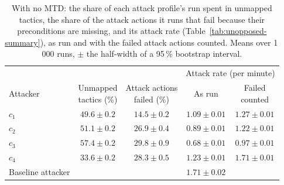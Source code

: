 
\begin{table}[htbp]
\centering
\caption[Where the APT attacker model's run time goes]{With no MTD: the share of each attack profile's run spent in unmapped tactics, the share of the attack actions it runs that fail because their preconditions are missing, and its attack rate (Table~\ref{tab:unopposed-summary}), as run and with the failed attack actions counted. Means over 1\,000 runs, $\pm$ the half-width of a 95\,\% bootstrap interval.}
\label{tab:fa-run-time}
\tablestyle
\begin{tabular}{@{}l c c c c@{}}
\toprule
& & & \multicolumn{2}{c}{Attack rate (per minute)} \\
\cmidrule(lr){4-5}
Attacker & \shortstack{Unmapped\\tactics (\%)} & \shortstack{Attack actions\\failed (\%)} & As run & \shortstack{Failed\\counted} \\
\midrule
$c_1$ & $49.6 \pm 0.2$ & $14.5 \pm 0.2$ & $1.09 \pm 0.01$ & $1.27 \pm 0.01$ \\
$c_2$ & $51.1 \pm 0.2$ & $26.9 \pm 0.4$ & $0.89 \pm 0.01$ & $1.22 \pm 0.01$ \\
$c_3$ & $57.4 \pm 0.2$ & $29.8 \pm 0.9$ & $0.68 \pm 0.01$ & $0.97 \pm 0.01$ \\
$c_4$ & $33.6 \pm 0.2$ & $28.3 \pm 0.5$ & $1.23 \pm 0.01$ & $1.71 \pm 0.01$ \\
\midrule
Baseline attacker & & & $1.71 \pm 0.02$ & \\
\bottomrule
\end{tabular}
\end{table}
